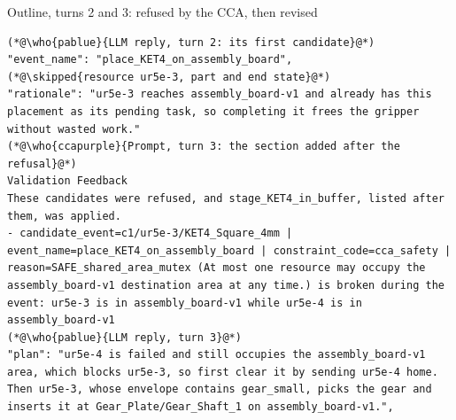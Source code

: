 \documentclass[preprint,12pt,authoryear]{elsarticle}
\newcommand{\vd}{\raisebox{-0.1ex}{\vbox{\baselineskip 3pt\lineskip 0pt\lineskiplimit 0pt\hbox{.}\hbox{.}\hbox{.}}}}
\newcommand{\skipped}[1]{{\normalfont\color{cutgray}\vd\enspace{\itshape\footnotesize #1}}}
\newcommand{\who}[2]{{\normalfont\sffamily\bfseries\footnotesize\color{#1}#2}}
\begin{document}
\begin{table}[H]
\begin{recbox}{Outline, turns 2 and 3: refused by the CCA, then revised}
\begin{lstlisting}
(*@\who{pablue}{LLM reply, turn 2: its first candidate}@*)
"event_name": "place_KET4_on_assembly_board",
(*@\skipped{resource ur5e-3, part and end state}@*)
"rationale": "ur5e-3 reaches assembly_board-v1 and already has this placement as its pending task, so completing it frees the gripper without wasted work."
(*@\who{ccapurple}{Prompt, turn 3: the section added after the refusal}@*)
Validation Feedback
These candidates were refused, and stage_KET4_in_buffer, listed after them, was applied.
- candidate_event=c1/ur5e-3/KET4_Square_4mm | event_name=place_KET4_on_assembly_board | constraint_code=cca_safety | reason=SAFE_shared_area_mutex (At most one resource may occupy the assembly_board-v1 destination area at any time.) is broken during the event: ur5e-3 is in assembly_board-v1 while ur5e-4 is in assembly_board-v1
(*@\who{pablue}{LLM reply, turn 3}@*)
"plan": "ur5e-4 is failed and still occupies the assembly_board-v1 area, which blocks ur5e-3, so first clear it by sending ur5e-4 home. Then ur5e-3, whose envelope contains gear_small, picks the gear and inserts it at Gear_Plate/Gear_Shaft_1 on assembly_board-v1.",
\end{lstlisting}
\end{recbox}
\caption{A safety refusal, the feedback in the next prompt, and the next reply.}\label{tab:cca}
\end{table}
\end{document}
